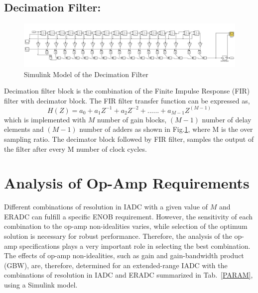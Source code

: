\subsection{Decimation Filter:}
\begin{figure}[h]
\centering
\includegraphics[width=\columnwidth]{Chap04/Figures/dec_filt.JPG}
\caption{Simulink Model of the Decimation Filter}
\label{SIM_DECFILT}
\end{figure}
Decimation filter block is the combination of the Finite Impulse Response (FIR) filter with decimator block. The FIR filter transfer function can be expressed as,
\begin{equation}
    H(Z) = a_0 + a_1Z^{-1} + a_2Z^{-2} + ...... + a_{M-1}Z^{\left(M-1\right)}
\end{equation}
which is implemented with $M$ number of gain blocks, $\left(M-1\right)$ number of delay elements and $\left(M-1\right)$ number of adders as shown in Fig.\ref{SIM_DECFILT}, where M is the over sampling ratio. The decimator block followed by FIR filter, samples the output of the filter after every M number of clock cycles.

\section{Analysis of Op-Amp Requirements}
Different combinations of resolution in IADC with a given value of $M$ and ERADC can fulfill a specific ENOB requirement. However, the sensitivity of each combination to the op-amp non-idealities varies, while selection of the optimum solution is necessary for robust performance. Therefore, the analysis of the op-amp specifications plays a very important role in selecting the best combination. The effects of op-amp non-idealities, such as gain and gain-bandwidth product (GBW), are, therefore, determined for an extended-range IADC with the combinations of resolution in IADC and ERADC summarized in Tab.~\ref{PARAM}, using a Simulink model.

